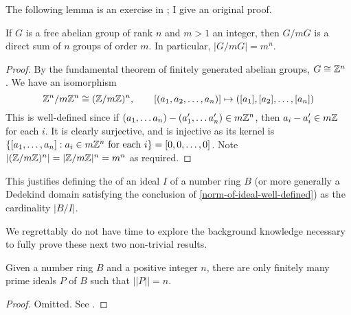 The following lemma is an exercise in \cite{NumberFields}; I give an original proof.
\begin{lemma}
If $G$ is a free abelian group of rank $n$ and $m>1$ an integer, then $G/mG$ is a direct sum of $n$ groups of order $m$. In particular, $|G/mG|=m^n$.
\end{lemma}
\begin{proof}
By the fundamental theorem of finitely generated abelian groups, $G\cong \mathbb{Z}^n$ \cite{GroupTheory}. We have an isomorphism $$\mathbb{Z}^n/m\mathbb{Z}^n\cong (\mathbb{Z}/m\mathbb{Z})^n, \qquad [(a_1,a_2,\dots,a_n)]\mapsto ([a_1],[a_2],\dots,[a_n])$$
This is well-defined since if $(a_1,\dots a_n)-(a_1',\dots a_n')\in m\mathbb{Z}^n$, then $a_i-a_i'\in m\mathbb{Z}$ for each $i$. It is clearly surjective, and is injective as its kernel is $\{[a_1,\dots,a_n]:a_i\in m\mathbb{Z}^n \text{ for each } i\}=[0,0,\dots,0]$.
Note $|(\mathbb{Z}/m\mathbb{Z})^n|=|\mathbb{Z}/m\mathbb{Z}|^n=m^n$ as required.
\end{proof}

This justifies defining the  of an ideal $I$ of a number ring $B$ (or more generally a Dedekind domain satisfying the conclusion of \cref{norm-of-ideal-well-defined}) as the cardinality $|B/I|$.

We regrettably do not have time to explore the background knowledge necessary to fully prove these next two non-trivial results. 

\begin{lemma}\label{finitely-many-prime-ideals}
Given a number ring $B$ and a positive integer $n$, there are only finitely many prime ideals $P$ of $B$ such that $||P||=n$.
\end{lemma}
\begin{proof}
Omitted. See \cite{NumberFields}.
\end{proof}

